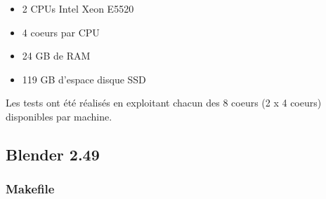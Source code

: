 \documentclass[a4paper, 11pt, titlepage]{article}
\begin{document}
\begin{itemize}

\item
2 CPUs Intel Xeon E5520

\item
4 coeurs par CPU

\item
24 GB de RAM

\item
119 GB d'espace disque SSD

\end{itemize}



Les tests ont été réalisés en exploitant chacun des 8 coeurs (2 x 4 coeurs) disponibles par machine.


\subsection {Blender 2.49}
\subsubsection {Makefile}



\end{document}
